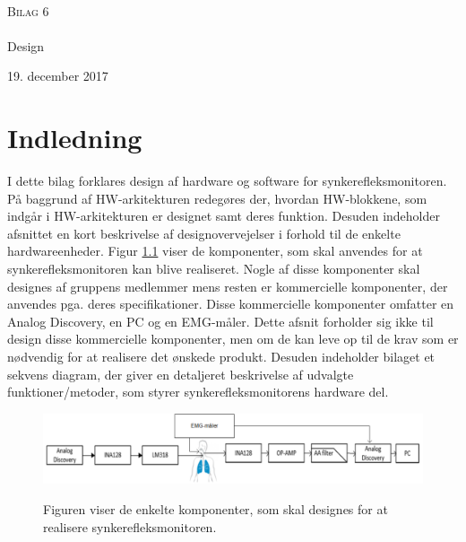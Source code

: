 

\begin{titlingpage}
\begin{center}

~ \\[3cm]

\textsc{\LARGE Bilag 6}\\[1.5cm]


\noindent\makebox[\linewidth]{\rule{\textwidth}{0.4pt}}\\
[0.5cm]{\Huge Design}
\noindent\makebox[\linewidth]{\rule{\textwidth}{0.4pt}}
\end{center}
\vfill
\begin{center}
{\large 19. december 2017}
\end{center}
\end{titlingpage}

\newpage
\tableofcontents*
\newpage

\chapter{Indledning}
I dette bilag forklares design af hardware og software  for synkerefleksmonitoren. På baggrund af HW-arkitekturen redegøres der, hvordan HW-blokkene, som indgår i HW-arkitekturen er designet samt deres funktion. Desuden indeholder afsnittet en kort beskrivelse af designovervejelser i forhold til de enkelte hardwareenheder. Figur \ref{blokflow} viser de komponenter, som skal anvendes for at synkerefleksmonitoren kan blive realiseret. Nogle af disse komponenter skal designes af gruppens medlemmer mens  resten er kommercielle komponenter, der anvendes pga. deres specifikationer. Disse kommercielle komponenter omfatter en Analog Discovery, en PC og en EMG-måler. Dette afsnit forholder sig ikke til design disse kommercielle komponenter, men om de kan leve op til de krav som er nødvendig for at realisere det ønskede produkt. Desuden indeholder bilaget et sekvens diagram, der  giver en detaljeret beskrivelse af udvalgte funktioner/metoder, som styrer synkerefleksmonitorens hardware del.   

\begin{figure}[H]
\centering
{\includegraphics[width=\linewidth]
{Figure/Blokaede}}
\caption{Figuren viser de enkelte komponenter, som skal designes for at realisere synkerefleksmonitoren.}
\label{blokflow}
\end{figure}



